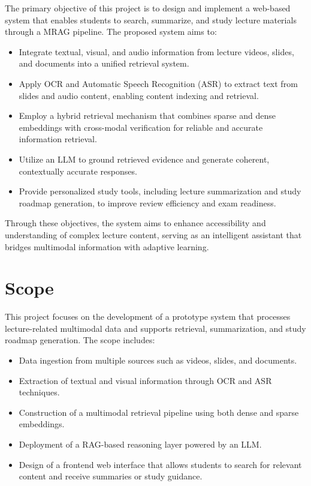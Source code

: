 The primary objective of this project is to design and implement a web-based system that enables students to search, summarize, and study lecture materials through a MRAG pipeline. The proposed system aims to:

\begin{itemize}
    \item Integrate textual, visual, and audio information from lecture videos, slides, and documents into a unified retrieval system. 
    \item Apply OCR and Automatic Speech Recognition (ASR) to extract text from slides and audio content, enabling content indexing and retrieval.
    \item Employ a hybrid retrieval mechanism that combines sparse and dense embeddings with cross-modal verification for reliable and accurate information retrieval.
    \item Utilize an LLM to ground retrieved evidence and generate coherent, contextually accurate responses.
    \item Provide personalized study tools, including lecture summarization and study roadmap generation, to improve review efficiency and exam readiness.
\end{itemize}

Through these objectives, the system aims to enhance accessibility and understanding of complex lecture content, serving as an intelligent assistant that bridges multimodal information with adaptive learning.

\section{Scope}

This project focuses on the development of a prototype system that processes lecture-related multimodal data and supports retrieval, summarization, and study roadmap generation. The scope includes:

\begin{itemize}
    \item Data ingestion from multiple sources such as videos, slides, and documents.
    \item Extraction of textual and visual information through OCR and ASR techniques.
    \item Construction of a multimodal retrieval pipeline using both dense and sparse embeddings.
    \item Deployment of a RAG-based reasoning layer powered by an LLM.
    \item Design of a frontend web interface that allows students to search for relevant content and receive summaries or study guidance.
\end{itemize}


